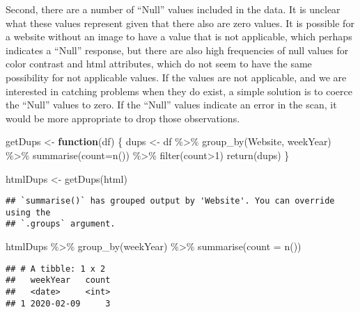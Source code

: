 \documentclass[
]{article}
\newenvironment{Shaded}{\begin{snugshade}}{\end{snugshade}}
\newcommand{\AttributeTok}[1]{\textcolor[rgb]{0.77,0.63,0.00}{#1}}
\newcommand{\ControlFlowTok}[1]{\textcolor[rgb]{0.13,0.29,0.53}{\textbf{#1}}}
\newcommand{\DecValTok}[1]{\textcolor[rgb]{0.00,0.00,0.81}{#1}}
\newcommand{\FunctionTok}[1]{\textcolor[rgb]{0.00,0.00,0.00}{#1}}
\newcommand{\NormalTok}[1]{#1}
\newcommand{\OtherTok}[1]{\textcolor[rgb]{0.56,0.35,0.01}{#1}}
\newcommand{\SpecialCharTok}[1]{\textcolor[rgb]{0.00,0.00,0.00}{#1}}
\begin{document}
Second, there are a number of ``Null'' values included in the data. It
is unclear what these values represent given that there also are zero
values. It is possible for a website without an image to have a value
that is not applicable, which perhaps indicates a ``Null'' response, but
there are also high frequencies of null values for color contrast and
html attributes, which do not seem to have the same possibility for not
applicable values. If the values are not applicable, and we are
interested in catching problems when they do exist, a simple solution is
to coerce the ``Null'' values to zero. If the ``Null'' values indicate
an error in the scan, it would be more appropriate to drop those
observations.

\begin{Shaded}
\begin{Highlighting}[]
\NormalTok{getDups }\OtherTok{\textless{}{-}} \ControlFlowTok{function}\NormalTok{(df) \{}
\NormalTok{  dups }\OtherTok{\textless{}{-}}\NormalTok{ df }\SpecialCharTok{\%\textgreater{}\%} 
    \FunctionTok{group\_by}\NormalTok{(Website, weekYear) }\SpecialCharTok{\%\textgreater{}\%}
    \FunctionTok{summarise}\NormalTok{(}\AttributeTok{count=}\FunctionTok{n}\NormalTok{()) }\SpecialCharTok{\%\textgreater{}\%}
    \FunctionTok{filter}\NormalTok{(count}\SpecialCharTok{\textgreater{}}\DecValTok{1}\NormalTok{) }
  \FunctionTok{return}\NormalTok{(dups)}
\NormalTok{\}}

\NormalTok{htmlDups }\OtherTok{\textless{}{-}} \FunctionTok{getDups}\NormalTok{(html)}
\end{Highlighting}
\end{Shaded}

\begin{verbatim}
## `summarise()` has grouped output by 'Website'. You can override using the
## `.groups` argument.
\end{verbatim}

\begin{Shaded}
\begin{Highlighting}[]
\NormalTok{htmlDups }\SpecialCharTok{\%\textgreater{}\%} \FunctionTok{group\_by}\NormalTok{(weekYear) }\SpecialCharTok{\%\textgreater{}\%} \FunctionTok{summarise}\NormalTok{(}\AttributeTok{count =} \FunctionTok{n}\NormalTok{())}
\end{Highlighting}
\end{Shaded}

\begin{verbatim}
## # A tibble: 1 x 2
##   weekYear   count
##   <date>     <int>
## 1 2020-02-09     3
\end{verbatim}
\end{document}
